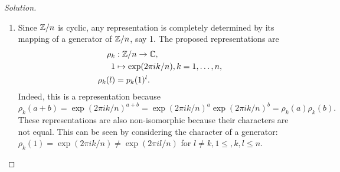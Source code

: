\begin{proof}[Solution]
\hfill
\begin{enumerate}[font=\normalfont,label=\textbf{(\alph*)}, wide]
\item Since $\mathbb{Z}/n$ is cyclic, any representation is completely determined by its mapping of a generator of $\mathbb{Z}/n$, say 1. The proposed representations are
\[
\begin{aligned}
\rho_k &: \mathbb{Z}/n \to \mathbb{C}, \\
1 &\mapsto \exp(2\pi i k/n), k = 1, \ldots, n, \\
\rho_k(l) &= p_k(1)^l.
\end{aligned}
\]
Indeed, this is a representation because
\[
\rho_k(a + b) = \exp(2\pi i k/n)^{a+b}= \exp(2\pi i k/n)^{a} \exp(2\pi i k/n)^{b} = \rho_k(a)\rho_k(b).
\]
These representations are also non-isomorphic because their characters are not equal. This can be seen by considering the character of a generator: $\rho_k(1) = \exp(2\pi i k/n) \neq \exp(2\pi i l/n)$ for $l \neq k, 1 \leq, k, l \leq n$.


\end{enumerate}
\end{proof}

